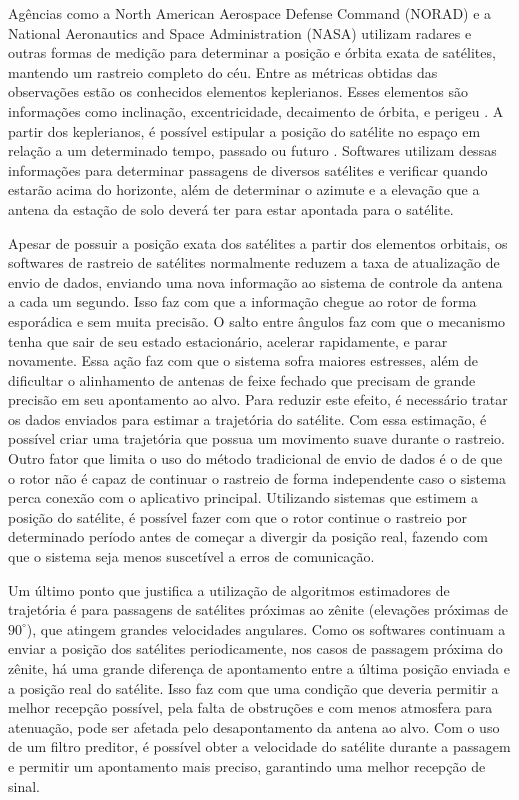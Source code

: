 Agências como a North American Aerospace Defense Command (NORAD) e a National Aeronautics and Space Administration (NASA) utilizam radares e outras formas de medição para determinar a posição e órbita exata de satélites, mantendo um rastreio completo do céu.
Entre as métricas obtidas das observações estão os conhecidos elementos keplerianos. Esses elementos são informações como inclinação, excentricidade, decaimento de órbita, e perigeu \cite{soler1994}.
A partir dos keplerianos, é possível estipular a posição do satélite no espaço em relação a um determinado tempo, passado ou futuro \cite{Ford2008}.
Softwares utilizam dessas informações para determinar passagens de diversos satélites e verificar quando estarão acima do horizonte, além de determinar o azimute e a elevação que a antena da estação de solo deverá ter para estar apontada para o satélite.

Apesar de possuir a posição exata dos satélites a partir dos elementos orbitais, os softwares de rastreio de satélites normalmente reduzem a taxa de atualização de envio de dados, enviando uma nova informação ao sistema de controle da antena a cada um segundo.
Isso faz com que a informação chegue ao rotor de forma esporádica e sem muita precisão. O salto entre ângulos faz com que o mecanismo tenha que sair de seu estado estacionário, acelerar rapidamente, e parar novamente. Essa ação faz com que o sistema sofra maiores estresses, além de dificultar o alinhamento de antenas de feixe fechado que precisam de grande precisão em seu apontamento ao alvo.
Para reduzir este efeito, é necessário tratar os dados enviados para estimar a trajetória do satélite. Com essa estimação, é possível criar uma trajetória que possua um movimento suave durante o rastreio.
Outro fator que limita o uso do método tradicional de envio de dados é o de que o rotor não é capaz de continuar o rastreio de forma independente caso o sistema perca conexão com o aplicativo principal.
Utilizando sistemas que estimem a posição do satélite, é possível fazer com que o rotor continue o rastreio por determinado período antes de começar a divergir da posição real, fazendo com que o sistema seja menos suscetível a erros de comunicação.

Um último ponto que justifica a utilização de algoritmos estimadores de trajetória é para passagens de satélites próximas ao zênite (elevações próximas de $90^\circ$), que atingem grandes velocidades angulares.
Como os softwares continuam a enviar a posição dos satélites periodicamente, nos casos de passagem próxima do zênite, há uma grande diferença de apontamento entre a última posição enviada e a posição real do satélite.
Isso faz com que uma condição que deveria permitir a melhor recepção possível, pela falta de obstruções e com menos atmosfera para atenuação, pode ser afetada pelo desapontamento da antena ao alvo.
Com o uso de um filtro preditor, é possível obter a velocidade do satélite durante a passagem e permitir um apontamento mais preciso, garantindo uma melhor recepção de sinal.

